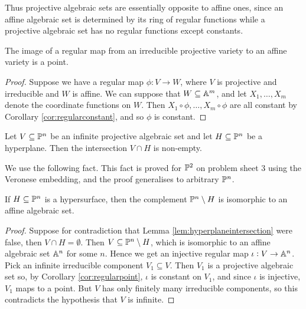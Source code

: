 Thus projective algebraic sets are essentially opposite to affine ones, since an affine algebraic set is determined by its ring of regular functions while a projective algebraic set has no regular functions except constants.

\begin{corollary}
\label{cor:regularpoint}
The image of a regular map from an irreducible projective variety to an affine variety is a point.
\end{corollary}

\begin{proof}
Suppose we have a regular map $ \phi : V \to W $, where $ V $ is projective and irreducible and $ W $ is affine. We can suppose that $ W \subseteq \AA^m $, and let $ X_1, \dots, X_m $ denote the coordinate functions on $ W $. Then $ X_1 \circ \phi, \dots, X_m \circ \phi $ are all constant by Corollary \ref{cor:regularconstant}, and so $ \phi $ is constant.
\end{proof}

\begin{lemma}
\label{lem:hyperplaneintersection}
Let $ V \subseteq \PP^n $ be an infinite projective algebraic set and let $ H \subseteq \PP^n $ be a hyperplane. Then the intersection $ V \cap H $ is non-empty.
\end{lemma}

We use the following fact. This fact is proved for $ \PP^2 $ on problem sheet $ 3 $ using the Veronese embedding, and the proof generalises to arbitrary $ \PP^n $.

\begin{fact*}
If $ H \subseteq \PP^n $ is a hypersurface, then the complement $ \PP^n \setminus H $ is isomorphic to an affine algebraic set.
\end{fact*}

\begin{proof}
Suppose for contradiction that Lemma \ref{lem:hyperplaneintersection} were false, then $ V \cap H = \emptyset $. Then $ V \subseteq \PP^n \setminus H $, which is isomorphic to an affine algebraic set $ \AA^n $ for some $ n $. Hence we get an injective regular map $ \iota : V \to \AA^n $. Pick an infinite irreducible component $ V_1 \subseteq V $. Then $ V_1 $ is a projective algebraic set so, by Corollary \ref{cor:regularpoint}, $ \iota $ is constant on $ V_1 $, and since $ \iota $ is injective, $ V_1 $ maps to a point. But $ V $ has only finitely many irreducible components, so this contradicts the hypothesis that $ V $ is infinite.
\end{proof}

